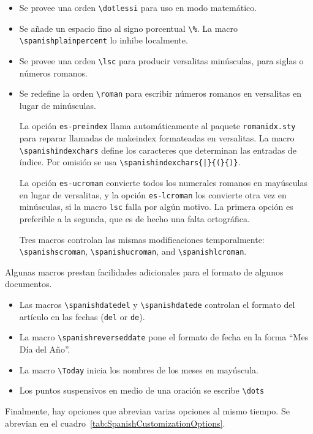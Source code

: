 \begin{itemize}
    \item Se provee una orden \verb|\dotlessi| para uso en modo matemático.
    \item Se añade un espacio fino al signo porcentual \verb|\%|. La macro \verb|\spanishplainpercent| lo inhibe localmente. 
    \item Se provee una orden \verb|\lsc| para producir versalitas minúsculas, para siglas o números romanos. 
    \item Se redefine la orden \verb|\roman| para escribir números romanos en versalitas en lugar de minúsculas.

    La opción \verb|es-preindex| llama automáticamente al paquete \verb|romanidx.sty| para reparar llamadas de makeindex formateadas en versalitas. La macro \verb|\spanishindexchars| define los caracteres que determinan las entradas de índice.  Por omisión se usa \verb=\spanishindexchars{|}{(}{)}=.

    La opción \verb|es-ucroman| convierte todos los numerales romanos en mayúsculas en lugar de versalitas, y la opción \verb|es-lcroman| los convierte otra vez en minúsculas, si la macro \verb|lsc| falla por algún motivo. La primera opción es preferible a la segunda, que es de hecho una falta ortográfica.

    Tres macros controlan las mismas modificaciones temporalmente: \verb|\spanishscroman|, \verb|\spanishucroman|, and \verb|\spanishlcroman|. 
\end{itemize}

Algunas macros prestan facilidades adicionales para el formato de algunos documentos.

\begin{itemize}
    \item Las macros \verb|\spanishdatedel| y \verb|\spanishdatede| controlan el formato del artículo en las fechas (\verb|del| or \verb|de|).
    \item La macro \verb|\spanishreverseddate| pone el formato de fecha en la forma ``Mes Día del Año''.
    \item La macro \verb|\Today| inicia los nombres de los meses en mayúscula.
    \item Los puntos suspensivos en medio de una oración se escribe \verb|\dots| 
 \end{itemize}
 
 Finalmente, hay opciones que abrevian varias opciones al mismo tiempo. Se abrevian en el cuadro~\ref{tab:SpanishCustomizationOptions}.

